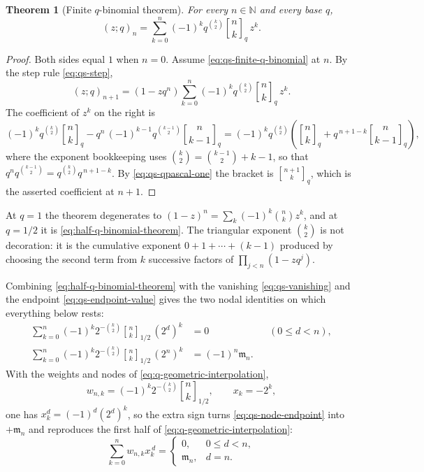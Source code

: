 \documentclass[11pt,oneside]{article}
\newtheorem{theorem}{Theorem}[section]
\theoremstyle{definition}
\theoremstyle{remark}
\newcommand{\N}{\mathbb N}
\newcommand{\qbinom}[3]{\genfrac{[}{]}{0pt}{}{#1}{#2}_{#3}}
\begin{document}
\begin{theorem}[Finite $q$-binomial theorem]
\label{thm:qs-finite-q-binomial}
For every $n\in\N$ and every base $q$,
\begin{equation}
 (z;q)_n=\sum_{k=0}^{n}(-1)^kq^{\binom k2}\qbinom nkq\,z^k. \label{eq:qs-finite-q-binomial}
\end{equation}
\end{theorem}

\begin{proof}
Both sides equal $1$ when $n=0$.  Assume \eqref{eq:qs-finite-q-binomial} at $n$.  By the step
rule \eqref{eq:qs-step},
\begin{equation*}
 (z;q)_{n+1}=(1-zq^n)\sum_{k=0}^{n}(-1)^kq^{\binom k2}\qbinom nkq\,z^k.
\end{equation*}
The coefficient of $z^k$ on the right is
\begin{equation*}
 (-1)^kq^{\binom k2}\qbinom nkq
 -q^{n}\,(-1)^{k-1}q^{\binom{k-1}2}\qbinom n{k-1}q
 =(-1)^kq^{\binom k2}\left(\qbinom nkq+q^{\,n+1-k}\qbinom n{k-1}q\right),
\end{equation*}
where the exponent bookkeeping uses $\binom k2=\binom{k-1}2+k-1$, so that
$q^{n}q^{\binom{k-1}2}=q^{\binom k2}q^{\,n+1-k}$.  By \eqref{eq:qs-qpascal-one} the bracket
is $\qbinom{n+1}kq$, which is the asserted coefficient at $n+1$.
\end{proof}

At $q=1$ the theorem degenerates to $(1-z)^n=\sum_k(-1)^k\binom nkz^k$, and at $q=1/2$ it is
\eqref{eq:half-q-binomial-theorem}.  The triangular exponent $\binom k2$ is not decoration:
it is the cumulative exponent $0+1+\cdots+(k-1)$ produced by choosing the second term from
$k$ successive factors of $\prod_{j<n}(1-zq^j)$.

Combining \eqref{eq:half-q-binomial-theorem} with the vanishing \eqref{eq:qs-vanishing} and
the endpoint \eqref{eq:qs-endpoint-value} gives the two nodal identities on which everything
below rests:
\begin{align}
 \sum_{k=0}^{n}(-1)^k2^{-\binom k2}\qbinom nk{1/2}\,(2^d)^k
 &=0 &&(0\le d<n),                                        \label{eq:qs-node-zero}\\
 \sum_{k=0}^{n}(-1)^k2^{-\binom k2}\qbinom nk{1/2}\,(2^n)^k
 &=(-1)^n\mathfrak m_n. &&                                \label{eq:qs-node-endpoint}
\end{align}
With the weights and nodes of \eqref{eq:q-geometric-interpolation},
\begin{equation}
 w_{n,k}=(-1)^k2^{-\binom k2}\qbinom nk{1/2},\qquad x_k=-2^k, \label{eq:qs-weights-nodes}
\end{equation}
one has $x_k^d=(-1)^d(2^d)^k$, so the extra sign turns \eqref{eq:qs-node-endpoint} into
$+\mathfrak m_n$ and reproduces the first half of \eqref{eq:q-geometric-interpolation}:
\begin{equation}
 \sum_{k=0}^{n}w_{n,k}x_k^{\,d}=
 \begin{cases}0,&0\le d<n,\\ \mathfrak m_n,&d=n.\end{cases} \label{eq:qs-moment-annihilation}
\end{equation}
\end{document}
